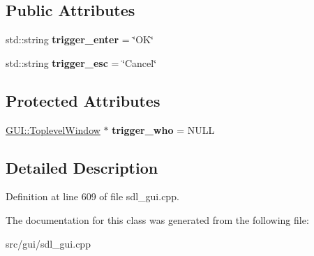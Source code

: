 \subsection*{Public Attributes}
\begin{DoxyCompactItemize}
\item 
\hypertarget{classInputWithEnterKey_ab1f039aa213cc2c6d189a712c456958e}{std\-::string {\bfseries trigger\-\_\-enter} = \char`\"{}O\-K\char`\"{}}\label{classInputWithEnterKey_ab1f039aa213cc2c6d189a712c456958e}

\item 
\hypertarget{classInputWithEnterKey_ad0f1644bc2918baa46e8c63d3193b3fe}{std\-::string {\bfseries trigger\-\_\-esc} = \char`\"{}Cancel\char`\"{}}\label{classInputWithEnterKey_ad0f1644bc2918baa46e8c63d3193b3fe}

\end{DoxyCompactItemize}
\subsection*{Protected Attributes}
\begin{DoxyCompactItemize}
\item 
\hypertarget{classInputWithEnterKey_a28afbaf196623f3534601338135fb6ea}{\hyperlink{classGUI_1_1ToplevelWindow}{G\-U\-I\-::\-Toplevel\-Window} $\ast$ {\bfseries trigger\-\_\-who} = N\-U\-L\-L}\label{classInputWithEnterKey_a28afbaf196623f3534601338135fb6ea}

\end{DoxyCompactItemize}


\subsection{Detailed Description}


Definition at line 609 of file sdl\-\_\-gui.\-cpp.



The documentation for this class was generated from the following file\-:\begin{DoxyCompactItemize}
\item 
src/gui/sdl\-\_\-gui.\-cpp\end{DoxyCompactItemize}
